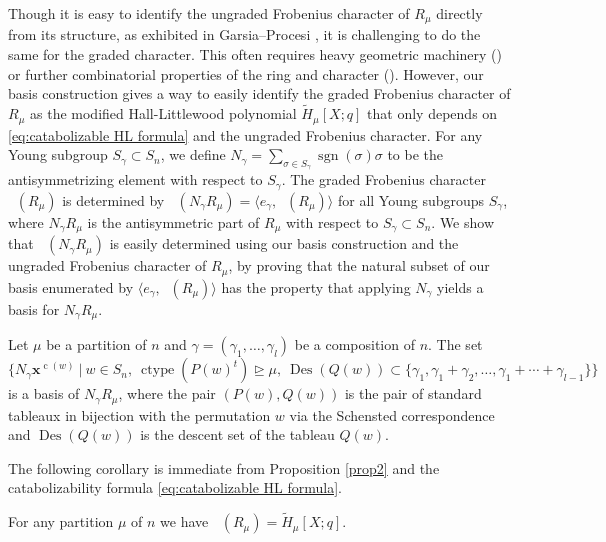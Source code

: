 \documentclass[ALCO, Unicode]{cedram}
\DeclareMathOperator{\ctype}{ctype}
\DeclareMathOperator{\Frob}{Frob}
\DeclareMathOperator{\Hilb}{Hilb}
\DeclareMathOperator{\cw}{c}
\DeclareMathOperator{\des}{Des}
\DeclareMathOperator{\sgn}{sgn}
\DeclareMathOperator{\Frobq}{\Frob_q}
\DeclareMathOperator{\Hilbq}{\Hilb_q}
\newcommand{\mHL}{\tilde{H}}
\begin{document}
Though it is easy to identify the ungraded Frobenius character of $R_\mu$ directly from its structure, as exhibited in Garsia--Procesi \cite{GP}, it is challenging to do the same for the graded character. This often requires heavy geometric machinery (\cite{deCon-Proc}) or further combinatorial properties of the ring and character (\cite{GP}).
However, our basis construction gives a way to easily identify the graded Frobenius character of $R_\mu$ as the modified Hall-Littlewood polynomial $\mHL_\mu[X;q]$ that only depends on \eqref{eq:catabolizable HL formula} and the ungraded Frobenius character.
For any Young subgroup $S_\gamma \subset S_n$, we define $N_{\gamma} = \sum_{\sigma\in S_\gamma} \sgn(\sigma) \sigma$ to be the antisymmetrizing element with respect to $S_\gamma$.
The graded Frobenius character $\Frobq(R_{\mu})$ is determined by $\Hilbq(N_\gamma R_{\mu}) = \langle e_\gamma, \Frobq(R_{\mu})\rangle$ for all Young subgroups $S_\gamma$, where $N_\gamma R_{\mu}$ is the antisymmetric part of $R_{\mu}$ with respect to $S_\gamma\subset S_n$.
We show that $\Hilbq(N_\gamma R_{\mu})$ is easily determined using our basis construction and the ungraded Frobenius character of $R_{\mu}$, by proving that the natural subset of our basis enumerated by $\langle e_\gamma, \Frobq(R_{\mu})\rangle$ has the property that applying $N_\gamma$ yields a basis for $N_\gamma R_{\mu}$.


\begin{prop2}\makeatletter{}\makeatother\label{prop2}
  Let $ \mu$ be a partition of $n$ and $\gamma = (\gamma_1,\dots, \gamma_l)$ be a composition of $n$. 
   The set
      \[ \{ N_\gamma \mathbf{x}^{\cw(w)} \ | \  w \in S_n, \ \ctype(P(w)^t) \unrhd\mu, \ \des(Q(w)) \subset \{\gamma_1,\gamma_1 + \gamma_2, \dots, \gamma_1 + \cdots + \gamma_{l-1}\}\}\]
    is a basis of $N_\gamma R_{\mu}$, where the pair $(P(w),Q(w))$ is the pair of standard tableaux in bijection with the permutation $w$ via the Schensted correspondence and $\des(Q(w))$ is the descent set of the tableau $Q(w)$.
\end{prop2}

The following corollary is immediate from Proposition \ref{prop2}  and the catabolizability formula \eqref{eq:catabolizable HL formula}.
\begin{cor3}
For any partition $\mu$ of $n$ we have $\Frobq(R_{\mu}) =\mHL_{\mu}[X;q].$
\end{cor3}
\end{document}
